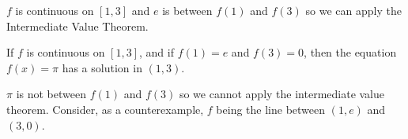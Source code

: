 \documentclass{ximera}
\begin{document}
\begin{exercise}
\begin{exercise}
\begin{exercise}
\begin{exercise}
\begin{multipleChoice}
\end{multipleChoice}

\begin{feedback}
$f$ is continuous on $\left[1,3\right]$ and $e$ is between $f(1)$ and $f(3)$ so we can apply the Intermediate Value Theorem.
\end{feedback}

\begin{exercise}

If $f$ is continuous on $\left[1,3\right]$, and if $f(1) = e$ and $f(3) = 0$, then the equation $f(x) = \pi$ has a solution in $\left(1,3\right)$.

\begin{multipleChoice}
\end{multipleChoice}

\begin{feedback}
$\pi$ is not between $f(1)$ and $f(3)$ so we cannot apply the intermediate value theorem.  Consider, as a counterexample, $f$ being the line between $(1,e)$ and $(3,0)$.
\end{feedback}

\end{exercise}
\end{exercise}
\end{exercise}
\end{exercise}
\end{exercise}
\end{document}
